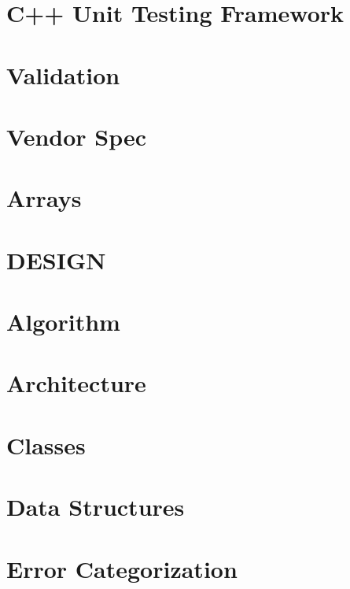 \let\mypdfximage\pdfximage\def\pdfximage{\immediate\mypdfximage}\documentclass[twoside]{book}
\newcommand{\+}{\discretionary{\mbox{\scriptsize$\hookleftarrow$}}{}{}}
\begin{document}
\chapter{C++ Unit Testing Framework}
\label{doc_decisions_unit_testing_md}

\chapter{Validation}
\label{doc_decisions_validation_md}

\chapter{Vendor Spec}
\label{doc_decisions_vendor_spec_md}

\chapter{Arrays}
\label{doc_decisions_warning-array_md}

\chapter{D\+E\+S\+I\+GN}
\label{doc_DESIGN_md}

\chapter{Algorithm}
\label{doc_dev_algorithm_md}

\chapter{Architecture}
\label{doc_dev_architecture_md}

\chapter{Classes}
\label{doc_dev_classes_md}

\chapter{Data Structures}
\label{doc_dev_data-structures_md}

\chapter{Error Categorization}
\label{doc_dev_error-categorization_md}

\end{document}
